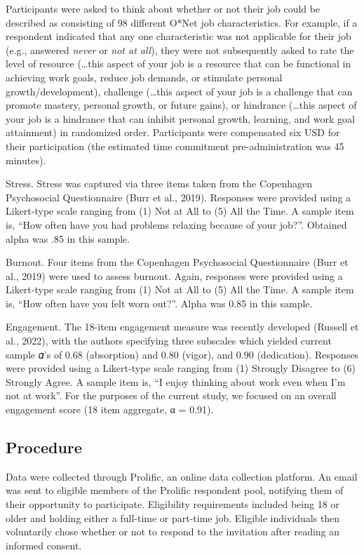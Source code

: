 \documentclass[
  man]{apa7}
\begin{document}
Participants were asked to think about whether or not their job could be described as consisting of 98 different O*Net job characteristics. For example, if a respondent indicated that any one characteristic was not applicable for their job (e.g., answered \emph{never} or \emph{not at all}), they were not subsequently asked to rate the level of resource (\ldots this aspect of your job is a resource that can be functional in achieving work goals, reduce job demands, or stimulate personal growth/development), challenge (\ldots this aspect of your job is a challenge that can promote mastery, personal growth, or future gains), or hindrance (\ldots this aspect of your job is a hindrance that can inhibit personal growth, learning, and work goal attainment) in randomized order. Participants were compensated six USD for their participation (the estimated time commitment pre-administration was 45 minutes).

Stress. Stress was captured via three items taken from the Copenhagen Psychosocial Questionnaire (Burr et al., 2019). Responses were provided using a Likert-type scale ranging from (1) Not at All to (5) All the Time. A sample item is, ``How often have you had problems relaxing because of your job?''. Obtained alpha was .85 in this sample.

Burnout. Four items from the Copenhagen Psychosocial Questionnaire (Burr et al., 2019) were used to assess burnout. Again, responses were provided using a Likert-type scale ranging from (1) Not at All to (5) All the Time. A sample item is, ``How often have you felt worn out?''. Alpha was 0.85 in this sample.

Engagement. The 18-item engagement measure was recently developed (Russell et al., 2022), with the authors specifying three subscales which yielded current sample 𝛼's of
0.68 (absorption) and 0.80 (vigor), and 0.90 (dedication). Responses were provided using a Likert-type scale ranging from (1) Strongly Disagree to (6) Strongly Agree. A sample item is, ``I enjoy thinking about work even when I'm not at work''. For the purposes of the current study, we focused on an overall engagement score (18 item aggregate, α = 0.91).

\hypertarget{procedure}{%
\subsection{Procedure}\label{procedure}}

Data were collected through Prolific, an online data collection platform. An email was sent to eligible members of the Prolific respondent pool, notifying them of their opportunity to participate. Eligibility requirements included being 18 or older and holding either a full-time or part-time job. Eligible individuals then voluntarily chose whether or not to respond to the invitation after reading an informed consent.
\end{document}
